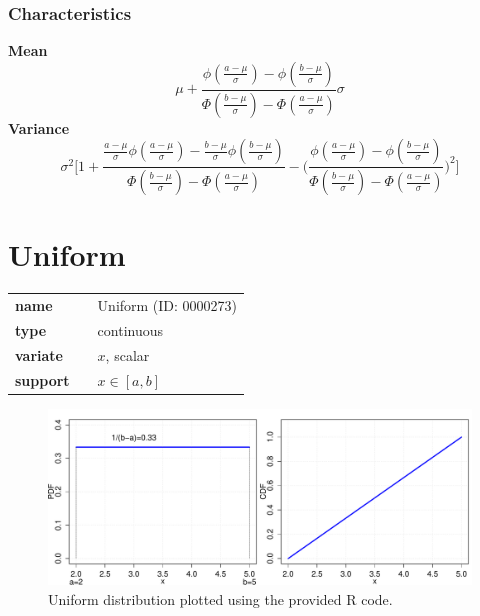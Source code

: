 \subsubsection*{Characteristics}
\smallskip \noindent \hspace{.2cm} \textbf{Mean} 
\begin{equation*}
\mu + \frac{ \phi(\frac{a-\mu}{\sigma}) - \phi(\frac{b-\mu}{\sigma}) }{ \Phi(\frac{b-\mu}{\sigma}) - \Phi(\frac{a-\mu}{\sigma}) } \sigma
\end{equation*}
\smallskip \noindent \hspace{.2cm} \textbf{Variance} 
\begin{equation*}\sigma^2 \Big[ 1 
+ \frac{ \frac{a-\mu}{\sigma}\phi(\frac{a-\mu}{\sigma}) - \frac{b-\mu}{\sigma}\phi(\frac{b-\mu}{\sigma}) }{ \Phi(\frac{b-\mu}{\sigma}) - \Phi(\frac{a-\mu}{\sigma}) } 
- \Big( \frac{ \phi(\frac{a-\mu}{\sigma}) - \phi(\frac{b-\mu}{\sigma}) }{ \Phi(\frac{b-\mu}{\sigma}) - \Phi(\frac{a-\mu}{\sigma}) } \Big)^2 \Big]\end{equation*}
\smallskip
\section*{Uniform} 

  \bigskip 

\begin{tabular}{p{2cm}cl}
\textbf{name} & & Uniform (ID: 0000273)\\ 
 
\textbf{type} & & continuous \\ 

\textbf{variate} & & $x$, scalar \\ 

\textbf{support} & & $x \in [a,b]$
\end{tabular}

\begin{figure}[ht!]
\centering
  \includegraphics[width=140mm]{pics/Uniform.pdf}
 \caption{Uniform distribution plotted using the provided R code.}
 \label{fig:Uniform}
\end{figure}

